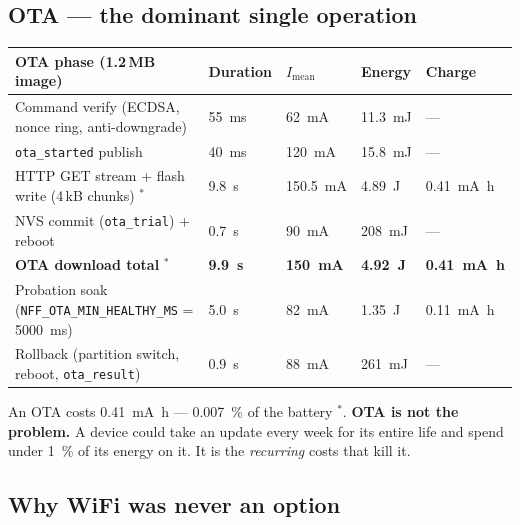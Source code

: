 \documentclass[11pt,a4paper]{article}
\newcommand{\meas}{\textcolor{ok}{$^{\ast}$}}
\begin{document}
\subsection{OTA --- the dominant single operation}

\begin{center}
\begin{tabularx}{\textwidth}{Xllll}
\toprule
\textbf{OTA phase} (1.2\,MB image) & \textbf{Duration} & \textbf{$I_\text{mean}$} & \textbf{Energy} & \textbf{Charge} \\
\midrule
Command verify (ECDSA, nonce ring, anti-downgrade)  & \SI{55}{\milli\second} & \SI{62}{\milli\ampere}  & \SI{11.3}{\milli\joule} & --- \\
\texttt{ota\_started} publish                       & \SI{40}{\milli\second} & \SI{120}{\milli\ampere} & \SI{15.8}{\milli\joule} & --- \\
HTTP GET stream + flash write (4\,kB chunks) \meas & \SI{9.8}{\second}    & \SI{150.5}{\milli\ampere} & \SI{4.89}{\joule}       & \SI{0.41}{\milli\ampere\hour} \\
NVS commit (\texttt{ota\_trial}) + reboot           & \SI{0.7}{\second}      & \SI{90}{\milli\ampere}  & \SI{208}{\milli\joule}  & --- \\
\midrule
\textbf{OTA download total} \meas & \textbf{\SI{9.9}{\second}} & \textbf{\SI{150}{\milli\ampere}} & \textbf{\SI{4.92}{\joule}} & \textbf{\SI{0.41}{\milli\ampere\hour}} \\
\midrule
Probation soak (\texttt{NFF\_OTA\_MIN\_HEALTHY\_MS} = \SI{5000}{\milli\second}) & \SI{5.0}{\second} & \SI{82}{\milli\ampere} & \SI{1.35}{\joule} & \SI{0.11}{\milli\ampere\hour} \\
Rollback (partition switch, reboot, \texttt{ota\_result})                        & \SI{0.9}{\second} & \SI{88}{\milli\ampere} & \SI{261}{\milli\joule} & --- \\
\bottomrule
\end{tabularx}
\end{center}

\noindent
An OTA costs \SI{0.41}{\milli\ampere\hour} --- \SI{0.007}{\percent} of the battery \meas. \textbf{OTA is
not the problem.} A device could take an update every week for its entire life and spend under
\SI{1}{\percent} of its energy on it. It is the \emph{recurring} costs that kill it.

\subsection{Why WiFi was never an option}
\end{document}
